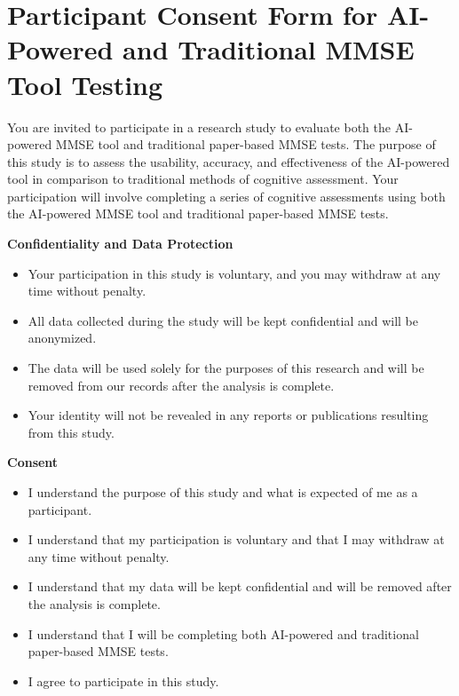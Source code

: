 {\small %
\section*{\small Participant Consent Form for AI-Powered and Traditional MMSE Tool Testing}
\vspace{-0.3cm}
\noindent
You are invited to participate in a research study to evaluate both the AI-powered MMSE tool and traditional paper-based MMSE tests. The purpose of this study is to assess the usability, accuracy, and effectiveness of the AI-powered tool in comparison to traditional methods of cognitive assessment. Your participation will involve completing a series of cognitive assessments using both the AI-powered MMSE tool and traditional paper-based MMSE tests.

\vspace{0.2cm}
\noindent
\textbf{Confidentiality and Data Protection}
\vspace{-0.2cm}
\begin{itemize}
    \setlength{\itemsep}{0pt}
    \item Your participation in this study is voluntary, and you may withdraw at any time without penalty.
    \item All data collected during the study will be kept confidential and will be anonymized.
    \item The data will be used solely for the purposes of this research and will be removed from our records after the analysis is complete.
    \item Your identity will not be revealed in any reports or publications resulting from this study.
\end{itemize}

\vspace{0.2cm}
\noindent
\textbf{Consent}
\vspace{-0.2cm}
\begin{itemize}
    \setlength{\itemsep}{0pt}
    \item I understand the purpose of this study and what is expected of me as a participant.
    \item I understand that my participation is voluntary and that I may withdraw at any time without penalty.
    \item I understand that my data will be kept confidential and will be removed after the analysis is complete.
    \item I understand that I will be completing both AI-powered and traditional paper-based MMSE tests.
    \item I agree to participate in this study.
\end{itemize}

}
